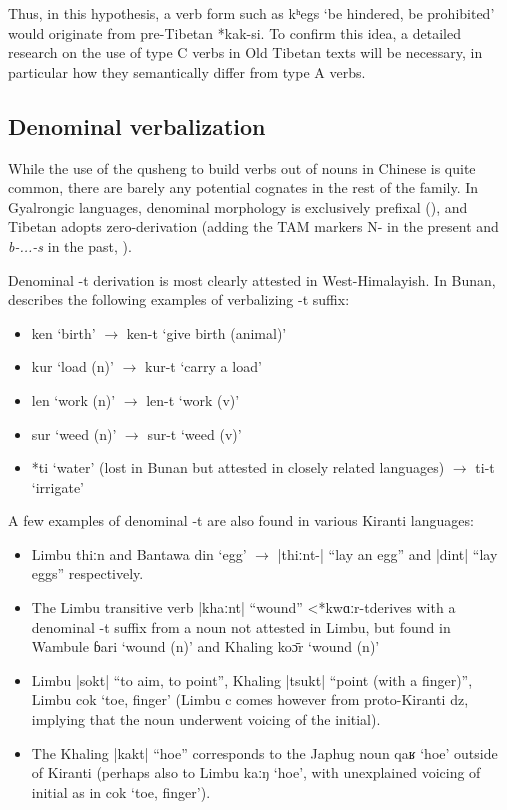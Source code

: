 \documentclass[oldfontcommands,oneside,a4paper,11pt]{article}
\newcommand{\ipa}[1]{{\phon \mbox{#1}}} %
\newcommand{\dhatu}[2]{|\ipa{#1}| ``#2''}
\begin{document}
Thus, in this hypothesis, a verb form such as \ipa{kʰegs} ‘be hindered, be prohibited’ would originate from pre-Tibetan *\ipa{kak-si}. To confirm this idea, a detailed research on the use of type C verbs in Old Tibetan texts will be necessary, in particular how they semantically differ from type A verbs.

 
\subsection{Denominal verbalization}
While the use of the qusheng to build verbs out of nouns in Chinese is quite common, there are barely any potential cognates in the rest of the family. In Gyalrongic languages, denominal morphology is exclusively prefixal (\citealt{jacques14antipassive}), and Tibetan adopts zero-derivation (adding the TAM markers N- in the present and \textit{b-...-s} in the past, \citealt[29]{jacques14tangoute}). 


Denominal \ipa{-t} derivation is most clearly attested in West-Himalayish. In Bunan, \citet[426]{widmer14bunan} describes the following examples of verbalizing -t suffix: 

\begin{itemize}
\item \ipa{ken} `birth' $\rightarrow$ \ipa{ken-t} `give birth (animal)'
\item \ipa{kur} `load (n)' $\rightarrow$ \ipa{kur-t} `carry a load'
\item \ipa{len} `work (n)' $\rightarrow$ \ipa{len-t} `work (v)'
\item \ipa{sur} `weed (n)' $\rightarrow$ \ipa{sur-t} `weed (v)'
\item *\ipa{ti} `water' (lost in Bunan but attested in closely related languages) $\rightarrow$ \ipa{ti-t} `irrigate'
\end{itemize}

A few examples of denominal \ipa{-t} are also found in various Kiranti languages:
\begin{itemize}
\item Limbu \ipa{thiːn} and Bantawa \ipa{din} `egg' $\rightarrow$ \dhatu{thiːnt-}{lay an egg} and \dhatu{dint}{lay eggs} respectively.  
\item The Limbu transitive verb \dhatu{khaːnt}{wound} <*\ipa{kwɑːr-t}derives with a denominal \ipa{-t} suffix from a noun not attested in Limbu, but found in Wambule \ipa{ɓari} `wound (n)' and Khaling \ipa{koɔ̄r} `wound (n)'
 \item Limbu \dhatu{sokt}{to aim, to point}, Khaling \dhatu{tsukt}{point (with a finger)}, Limbu \ipa{cok} `toe, finger' (Limbu \ipa{c} comes however from proto-Kiranti \ipa{dz}, implying that the noun underwent voicing of the initial).
 \item The Khaling \dhatu{kakt}{hoe} corresponds to the Japhug noun \ipa{qaʁ} `hoe' outside of Kiranti (perhaps also to Limbu \ipa{kaːŋ} `hoe', with unexplained voicing of initial as in \ipa{cok} `toe, finger').
\end{itemize}
\end{document}
